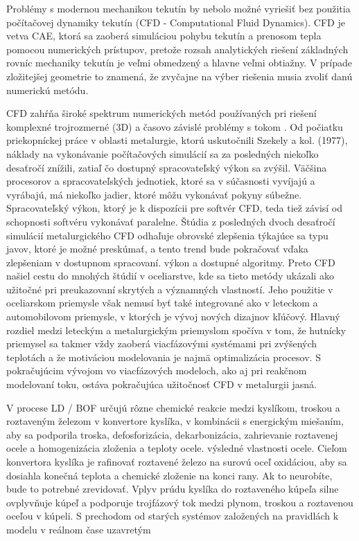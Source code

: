 \documentclass[]{tukediphc}
\begin{document}
Problémy s modernou mechanikou tekutín by nebolo možné vyriešiť bez použitia počítačovej dynamiky tekutín (CFD - Computational Fluid Dynamics). CFD je vetva CAE, ktorá sa zaoberá simuláciou pohybu tekutín a prenosom tepla pomocou numerických prístupov, pretože rozsah analytických riešení základných rovníc mechaniky tekutín je veľmi obmedzený a hlavne veľmi obtiažny. V prípade zložitejšej geometrie to znamená, že zvyčajne na výber riešenia musia zvoliť danú numerickú metódu. 

CFD zahŕňa široké spektrum numerických metód používaných pri riešení komplexné trojrozmerné (3D) a časovo závislé problémy s tokom \citep{RAPP20173}. Od počiatku priekopníckej práce v oblasti metalurgie, ktorú uskutočnili Szekely a kol. (1977), náklady na vykonávanie počítačových simulácií sa za posledných niekoľko desaťročí znížili, zatiaľ čo dostupný spracovateľský výkon sa zvýšil. Väčšina procesorov a spracovateľských jednotiek, ktoré sa v súčasnosti vyvíjajú a vyrábajú, má niekoľko jadier, ktoré môžu vykonávať pokyny súbežne. Spracovateľský výkon, ktorý je k dispozícii pre softvér CFD, teda tiež závisí od schopnosti softvéru vykonávať paralelne. Štúdia z posledných dvoch desaťročí \citep{Ersson2018} simulácií metalurgického CFD odhaľuje obrovské zlepšenia týkajúce sa typu javov, ktoré je možné preskúmať, a tento trend bude pokračovať vďaka zlepšeniam v dostupnom spracovaní. výkon a dostupné algoritmy. Preto CFD našiel cestu do mnohých štúdií v oceliarstve, kde sa tieto metódy ukázali ako užitočné pri preukazovaní skrytých a významných vlastností. Jeho použitie v oceliarskom priemysle však nemusí byť také integrované ako v leteckom a automobilovom priemysle, v ktorých je vývoj nových dizajnov kľúčový. Hlavný rozdiel medzi leteckým a metalurgickým priemyslom spočíva v tom, že hutnícky priemysel sa takmer vždy zaoberá viacfázovými systémami pri zvýšených teplotách a že motiváciou modelovania je najmä optimalizácia procesov. S pokračujúcim vývojom vo viacfázových modeloch, ako aj pri reakčnom modelovaní toku, ostáva pokračujúca užitočnosť CFD v metalurgii jasná.

V procese LD / BOF určujú rôzne chemické reakcie medzi kyslíkom, troskou a roztaveným železom v konvertore kyslíka, v kombinácii s energickým miešaním, aby sa podporila troska, defosforizácia, dekarbonizácia, zahrievanie roztavenej ocele a homogenizácia zloženia a teploty ocele. výsledné vlastnosti ocele. Cieľom konvertora kyslíka je rafinovať roztavené železo na surovú oceľ oxidáciou, aby sa dosiahla konečná teplota a chemické zloženie na konci rany. Ak to neurobíte, bude to potrebné zrevidovať. Vplyv prúdu kyslíka do roztaveného kúpeľa silne ovplyvňuje kúpeľ a podporuje trojfázový tok medzi plynom, troskou a roztavenou oceľou v kúpeli. S prechodom od starých systémov založených na pravidlách k modelu v reálnom čase uzavretým
\end{document}
